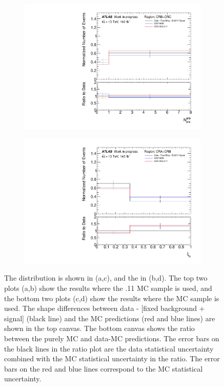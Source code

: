 \begin{figure}[t]
\begin{subfigure}[b]{0.48\textwidth}
    \includegraphics[width=\textwidth]{plots/diffx/biastest_13Feb_shsignal_twobins_N_gapjets.pdf}%
    \caption{\label{biasc}}
  \end{subfigure}
  \hfill
  \begin{subfigure}[b]{0.48\textwidth}
    \centering
    \includegraphics[width=\textwidth]{plots/diffx/biastest_13Feb_shsignal_twobins_ly_centrality.pdf}
    \caption{\label{biasd}}
  \end{subfigure}
  \caption{The \Ngapjets distribution is shown in (a,c), and the \xily in (b,d). The top two plots (a,b) show the results where the .11 \ewwy MC sample is used, and the bottom two plots (c,d) show the results where the  \ewwy MC sample is used. The shape differences between data - [fixed background + signal] (black line) and the \qcdwy MC predictions (red and blue lines) are shown in the top canvas. The bottom canvas shows the ratio between the purely MC and data-MC predictions. The error bars on the black lines in the ratio plot are the data statistical uncertainty combined with the MC statistical uncertainty in the ratio. The error bars on the red and blue lines correspond to the MC statistical uncertainty.}
  \label{fig:centralityngapjets}
\end{figure}

